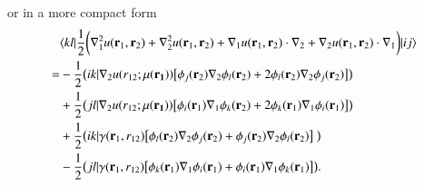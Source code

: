 \documentclass[aip,jcp,reprint,noshowkeys,superscriptaddress]{revtex4-1}
\newcommand{\matelem}[3]{\langle #1 | #2 | #3 \rangle}
\newcommand{\br}[0]{{\bf {r}}}
\newcommand{\bri}[1]{{\bf r}_{#1}}
\newcommand{\mur}[1]{\mu({\bf r_{#1}})}
\begin{document}
or in a more compact form 
\begin{equation}
 \label{eq:lapl_nh_0}
 \begin{aligned}
& \matelem{kl}{\frac{1}{2}\bigg( \nabla_1^2 u(\bri{1},\bri{2}) + \nabla_2^2u(\bri{1},\bri{2}) + \nabla_1 u(\bri{1},\bri{2}) \cdot \nabla_2 + \nabla_2 u(\bri{1},\bri{2}) \cdot \nabla_1 \bigg)}{ij} \\
=& -\frac{1}{2} \big(ik|\nabla_2u(r_{12};\mur{1}) \big[ \phi_j(\br_2)\nabla_2 \phi_l(\br_2) + 2 \phi_l(\br_2) \nabla_2 \phi_j(\br_2)\big] \big) \\
 & +\frac{1}{2} \big(jl|\nabla_2u(r_{12};\mur{1}) \big[ \phi_i(\br_1)\nabla_1 \phi_k(\br_2) + 2 \phi_k(\br_1) \nabla_1 \phi_i(\br_1)\big] \big) \\
 & +\frac{1}{2} \big(ik|{\bf {\gamma}}(\br_1, r_{12}) \big[ \phi_l(\br_2)\nabla_2 \phi_j(\br_2) + \phi_j(\br_2)\nabla_2 \phi_l(\br_2) \big] \big) \\
 & -\frac{1}{2} \big(jl|{\bf {\gamma}}(\br_1, r_{12}) \big[ \phi_k(\br_1) \nabla_1 \phi_i(\br_1) + \phi_i(\br_1) \nabla_1 \phi_k(\br_1) \big] \big).
 \end{aligned}
\end{equation}
\end{document}
